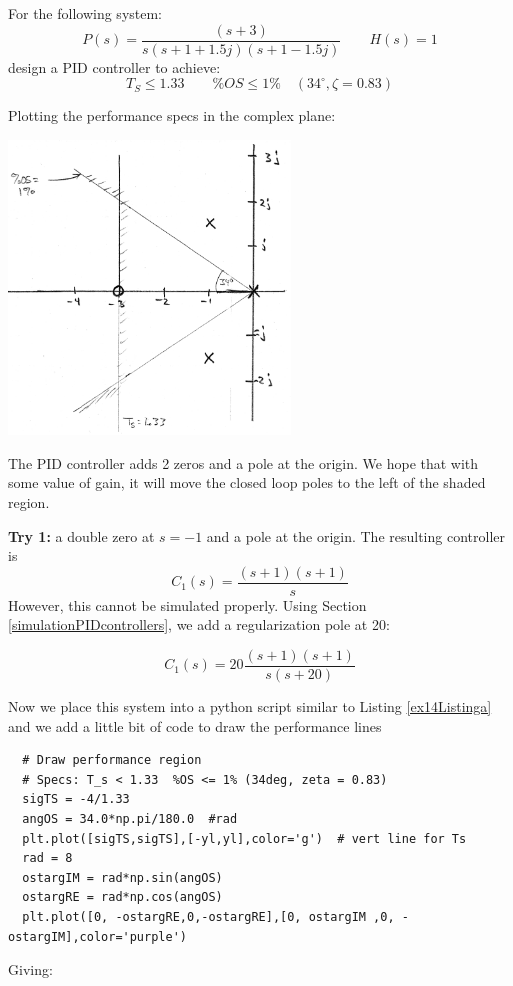 \begin{Example}
For the following system:
\[
P(s) = \frac {(s+3)} {s(s+1+1.5j)(s+1-1.5j)}  \qquad   H(s) = 1
\]
design a PID controller to achieve:
\[
T_S \leq 1.33 \qquad \%OS \leq 1\% \quad (34^\circ, \zeta = 0.83)
\]

Plotting the performance specs in the complex plane:

\begin{center}
\includegraphics[width=75mm]{figs09/00928a.png}
\end{center}

The PID controller adds 2 zeros and a pole at the origin.   We hope that with some value of gain, it will move the closed loop poles to the left of the shaded region.

{\bf Try 1: } a double zero at $s=-1$ and a pole at the origin.   The resulting controller is
\[
C_1(s) = \frac{(s+1)(s+1)}{s}
\]
However, this cannot be simulated properly.   Using Section \ref{simulationPIDcontrollers}, we add a regularization pole at 20:

\[
C_1(s) = 20\frac{(s+1)(s+1)}{s(s+20)}
\]

Now we place this system into a python script similar to
Listing \ref{ex14Listinga} and we add a little bit of code to
draw the performance lines
\begin{verbatim}
  # Draw performance region
  # Specs: T_s < 1.33  %OS <= 1% (34deg, zeta = 0.83)
  sigTS = -4/1.33
  angOS = 34.0*np.pi/180.0  #rad
  plt.plot([sigTS,sigTS],[-yl,yl],color='g')  # vert line for Ts
  rad = 8
  ostargIM = rad*np.sin(angOS)
  ostargRE = rad*np.cos(angOS)
  plt.plot([0, -ostargRE,0,-ostargRE],[0, ostargIM ,0, -ostargIM],color='purple')
\end{verbatim}
\end{Example}
Giving:

